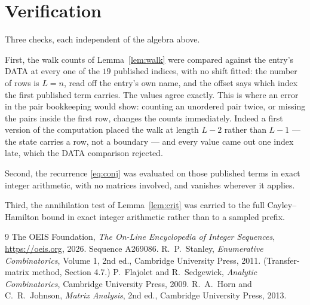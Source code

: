 \documentclass[11pt,a4paper]{article}
\theoremstyle{plain}
\theoremstyle{definition}
\begin{document}
\section{Verification}

Three checks, each independent of the algebra above.

First, the walk counts of Lemma~\ref{lem:walk} were compared against the entry's DATA at
every one of the $19$ published indices, with no shift fitted: the number of rows is
$L=n$, read off the entry's own name, and the offset says which index the first
published term carries. The values agree exactly. This is where an error in the pair
bookkeeping would show: counting an unordered pair twice, or missing the pairs inside the
first row, changes the counts immediately. Indeed a first version of the computation
placed the walk at length $L-2$ rather than $L-1$ --- the state carries a row, not a
boundary --- and every value came out one index late, which the DATA comparison rejected.

Second, the recurrence \eqref{eq:conj} was evaluated on those published terms in exact
integer arithmetic, with no matrices involved, and vanishes wherever it applies.

Third, the annihilation test of Lemma~\ref{lem:crit} was carried to the full
Cayley--Hamilton bound in exact integer arithmetic rather than to a sampled prefix.

\begin{thebibliography}{9}
 The OEIS Foundation, \emph{The On-Line Encyclopedia of Integer
Sequences}, \url{https://oeis.org}, 2026. Sequence A269086.
 R.~P.~Stanley, \emph{Enumerative Combinatorics}, Volume 1, 2nd ed.,
Cambridge University Press, 2011. (Transfer-matrix method, Section 4.7.)
 P.~Flajolet and R.~Sedgewick, \emph{Analytic Combinatorics}, Cambridge
University Press, 2009.
 R.~A.~Horn and C.~R.~Johnson, \emph{Matrix Analysis}, 2nd ed., Cambridge
University Press, 2013.
\end{thebibliography}
\end{document}
